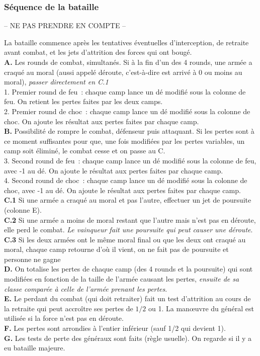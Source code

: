 \subsubsection{Séquence de la bataille}
-- NE PAS PRENDRE EN COMPTE --

\noindent
La bataille commence après les tentatives éventuelles d'interception, de
retraite avant combat, et les jets d'attrition des forces qui ont
bougé. \\
{\bf A.} Les rounds de combat, simultanés.
Si à la fin d'un des 4 rounds, une armée a craqué au moral (aussi appelé déroute,
c'est-à-dire est arrivé à 0 ou moins au moral), \textit{passer directement en C.1} \\
1. Premier round de feu~: chaque camp lance un dé modifié sous la colonne de feu. On retient les
pertes faites par les deux camps. \\
2. Premier round de choc~: chaque camp lance un dé modifié sous la colonne de choc. On ajoute les
résultat aux pertes faites par chaque camp. \\
{\bf B.} Possibilité de rompre le combat, défenseur puis attaquant. Si les
pertes sont à ce moment suffisantes pour que, une fois modifiées par les pertes variables,
un camp soit éliminé, le combat cesse et on passe au C. \\
3. Second round de feu~: chaque camp lance un dé modifié sous la colonne de feu, avec -1 au dé.
On ajoute le résultat aux pertes faites par chaque camp. \\
4. Second round de choc~: chaque camp lance un dé modifié sous la colonne de choc, avec -1 au dé.
On ajoute le résultat aux pertes faites par chaque camp. \\
{\bf C.1} Si une armée a craqué au moral et pas l'autre, effectuer un jet de poursuite (colonne E). \\
{\bf C.2} Si une armée a moins de moral restant que l'autre mais n'est pas en déroute, elle perd le combat.
\textit{Le vainqueur fait une poursuite qui peut causer une déroute}. \\
{\bf C.3} Si les deux armées ont le même moral final ou que les deux ont craqué au moral,
chaque camp retourne d'où il vient, on ne fait pas de poursuite et personne ne gagne \\
{\bf D.} On totalise les pertes de chaque camp (des 4 rounds et la poursuite) qui sont modifiées
en fonction de la taille de l'armée causant les pertes,
\textit{ensuite de sa classe comparée à celle de
l'armée prenant les pertes}. \\
{\bf E.} Le perdant du combat (qui doit retraiter) fait un test d'attrition au cours de la retraite
qui peut accroître ses pertes de $1/2$ ou 1. La man{\oe}uvre du général est utilisée
si la force n'est pas en déroute. \\
{\bf F.} Les pertes sont arrondies à l'entier inférieur (sauf 1/2 qui devient 1).\\
{\bf G.} Les tests de perte des généraux sont faits (règle usuelle). On regarde si
il y a eu bataille majeure. \\

